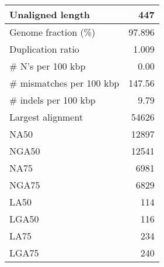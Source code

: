 \documentclass[12pt,a4paper]{article}
\begin{document}
\begin{table}[ht]
\begin{center}
\begin{tabular}{|l*{1}{|r}|}
Unaligned length & 447 \\ \hline
Genome fraction (\%) & 97.896 \\ \hline
Duplication ratio & 1.009 \\ \hline
\# N's per 100 kbp & 0.00 \\ \hline
\# mismatches per 100 kbp & 147.56 \\ \hline
\# indels per 100 kbp & 9.79 \\ \hline
Largest alignment & 54626 \\ \hline
NA50 & 12897 \\ \hline
NGA50 & 12541 \\ \hline
NA75 & 6981 \\ \hline
NGA75 & 6829 \\ \hline
LA50 & 114 \\ \hline
LGA50 & 116 \\ \hline
LA75 & 234 \\ \hline
LGA75 & 240 \\ \hline
\end{tabular}
\end{center}
\end{table}
\end{document}
